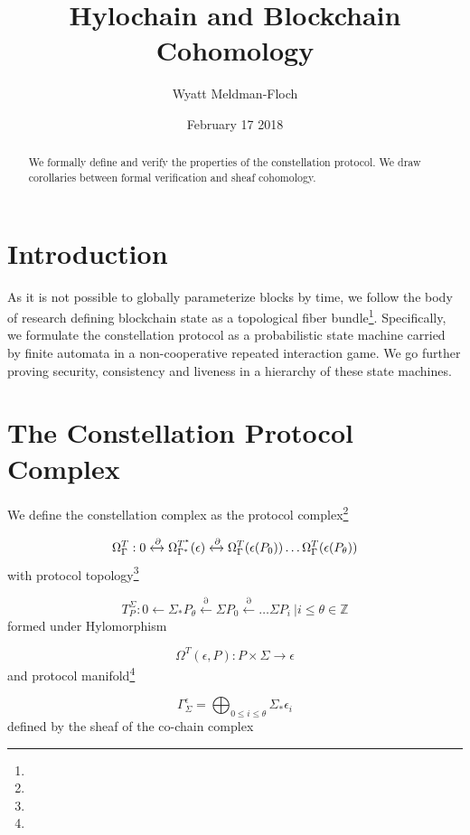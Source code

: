 \documentclass{article}
\title{Hylochain and Blockchain Cohomology}
\author{Wyatt Meldman-Floch}
\date{February 17 2018}
\begin{document}
\maketitle

\begin{abstract}
We formally define and verify the properties of the constellation protocol. We draw corollaries between formal verification and  sheaf cohomology.
\end{abstract}
\setcounter{secnumdepth}{0}
\section{Introduction}
As it is not possible to globally parameterize blocks by time, we follow the body of research defining blockchain state as a topological fiber bundle\footnote{}. Specifically, we formulate the constellation protocol as a probabilistic state machine carried by finite automata in a non-cooperative repeated interaction game. We go further proving security, consistency and liveness in a hierarchy of these state machines.

\section{The Constellation Protocol Complex}
We define the constellation complex as the protocol complex\footnote{} 

\begin{equation} \label{eq1}
\Omega^T_\Gamma: 0 \xleftrightarrow{\partial} \Omega^{T^*}_{\Gamma^*}(\epsilon) \xleftrightarrow{\partial}  \Omega^T_\Gamma (\epsilon(P_0)) \dots \Omega^T_\Gamma (\epsilon(P_\theta))
\end{equation} \label{eq1} 
with protocol topology\footnote{} 

\begin{equation} \label{eq1}
T^{\Sigma}_P: 0 \leftarrow \Sigma_{*}P_\theta \xleftarrow{\partial} \Sigma P_{0} \xleftarrow{\partial} \dots \Sigma P_i \ | i \leq \theta \in \mathbb{Z}
\end{equation} \label{eq1}
formed under Hylomorphism

\begin{equation} \label{eq1}
\Omega^T(\epsilon, P): P \times \Sigma \rightarrow \epsilon
\end{equation} \label{eq1}
and protocol manifold\footnote{} 

\begin{equation} \label{eq1}
\Gamma^\epsilon_{\Sigma} = \bigoplus_{0 \leq i \leq \theta} \Sigma_* \epsilon_i
\end{equation} \label{eq1}
defined by the sheaf of the co-chain complex
\end{document}
